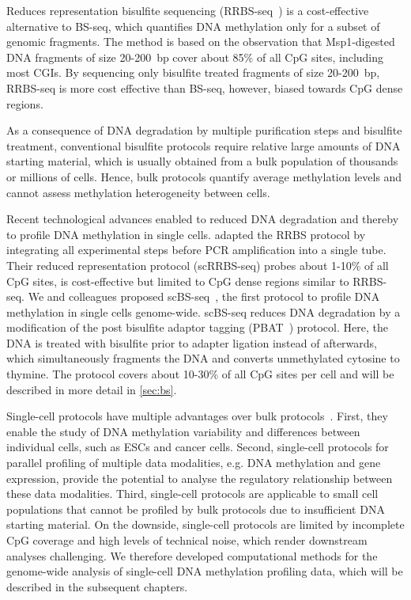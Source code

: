 Reduces representation bisulfite sequencing (RRBS-seq~\citep{meissner_genome-scale_2008-1,smith_high-throughput_2009}) is a cost-effective alternative to BS-seq, which quantifies DNA methylation only for a subset of genomic fragments. The method is based on the observation that Msp1-digested DNA fragments of size 20-200~bp cover about 85\% of all CpG sites, including most CGIs. By sequencing only bisulfite treated fragments of size 20-200~bp, RRBS-seq is more cost effective than BS-seq, however, biased towards CpG dense regions.

As a consequence of DNA degradation by multiple purification steps and bisulfite treatment, conventional bisulfite protocols require relative large amounts of DNA starting material, which is usually obtained from a bulk population of thousands or millions of cells. Hence, bulk protocols quantify average methylation levels and cannot assess methylation heterogeneity between cells.

Recent technological advances enabled to reduced DNA degradation and thereby to profile DNA methylation in single cells. \citet{guo_profiling_2015} adapted the RRBS protocol by integrating all experimental steps before PCR amplification into a single tube. Their reduced representation protocol (scRRBS-seq) probes about 1-10\% of all CpG sites, is cost-effective but limited to CpG dense regions similar to RRBS-seq. We and colleagues proposed scBS-seq~\citep{smallwood_single-cell_2014}, the first protocol to profile DNA methylation in single cells genome-wide. scBS-seq reduces DNA degradation by a modification of the post bisulfite adaptor tagging (PBAT~\citep{miura_amplification-free_2012-1}) protocol. Here, the DNA is treated with bisulfite prior to adapter ligation instead of afterwards, which simultaneously fragments the DNA and converts unmethylated cytosine to thymine. The protocol covers about 10-30\% of all CpG sites per cell and will be described in more detail in \cref{sec:bs}.

Single-cell protocols have multiple advantages over bulk protocols~\citep{schwartzman_single-cell_2015}. First, they enable the study of DNA methylation variability and differences between individual cells, such as ESCs and cancer cells. Second, single-cell protocols for parallel profiling of multiple data modalities, e.g. DNA methylation and gene expression, provide the potential to analyse the regulatory relationship between these data modalities. Third, single-cell protocols are applicable to small cell populations that cannot be profiled by bulk protocols due to insufficient DNA starting material. On the downside, single-cell protocols are limited by incomplete CpG coverage and high levels of technical noise, which render downstream analyses challenging. We therefore developed computational methods for the genome-wide analysis of single-cell DNA methylation profiling data, which will be described in the subsequent chapters.

